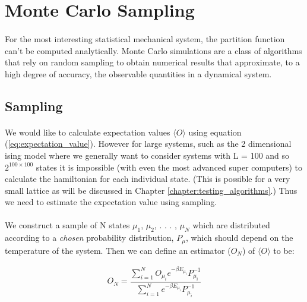 \documentclass[12pt] {report} %
\begin{document}
		\section{Monte Carlo Sampling}
			
			\paragraph{}
				For the most interesting statistical mechanical system, the partition function can't be computed analytically. Monte Carlo simulations are a class of algorithms that rely on random sampling to obtain numerical results that approximate,  to a high degree of accuracy, the observable quantities in a dynamical system. 
			
			\subsection{Sampling}
			
				\paragraph{}
					We would like to calculate expectation values $\langle O \rangle$ using equation (\ref{eq:expectation_value}). However for large systems, such as the 2 dimensional ising model where we generally want to consider systems with L = 100 and so $ 2^{100 \times 100} $ states it is impossible (with even the most advanced super computers) to calculate the hamiltonian for each individual state. (This is possible for a very small lattice as will be discussed in Chapter \ref{chapter:testing_algorithms}.) Thus we need to estimate the expectation value using sampling.
					
				\paragraph{}
					We construct a sample of N states {$\mu_1$, $\mu_2$, . . . , $\mu_N$} which are distributed according to a \textit{chosen} probability distribution, $P_\mu$, which should depend on the temperature of the system. Then we can define an estimator ($O_N$) of $\langle O \rangle$ to be:
				
				\begin{align}
					O_N = \dfrac{\sum_{i=1}^{N}O_{\mu_i}e^{-\beta E_{\mu_i}} P_{\mu_i}^{-1}}{\sum_{i=1}^{N} e^{-\beta E_{\mu_i}}P_{\mu_i}^{-1}}		\label{eq:sampling}
				\end{align}
				
\end{document}
